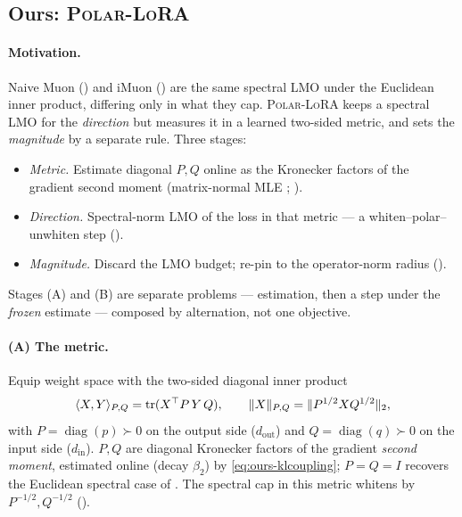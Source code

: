 \documentclass[11pt]{article}
\DeclareMathOperator{\diag}{diag}
\DeclarePairedDelimiter{\norm}{\lVert}{\rVert}
\newcommand{\methodname}{\textsc{Polar-LoRA}\xspace}
\theoremstyle{plain}
\theoremstyle{definition}
\theoremstyle{remark}
\begin{document}
\subsection{Ours: \methodname}
\label{sec:method-ours}
\paragraph{Motivation.} Naive Muon () and iMuon () are the same spectral LMO under the Euclidean inner product, differing only in what they cap. \methodname{} keeps a spectral LMO for the \emph{direction} but measures it in a learned two-sided metric, and sets the \emph{magnitude} by a separate rule. Three stages:
\begin{itemize}[leftmargin=1.7em,itemsep=1pt,topsep=2pt]
  \item[(A)] \emph{Metric.} Estimate diagonal $P,Q$ online as the Kronecker factors of the gradient second moment (matrix-normal MLE \cite{klshampoo}; ).
  \item[(B)] \emph{Direction.} Spectral-norm LMO of the loss in that metric --- a whiten--polar--unwhiten step ().
  \item[(C)] \emph{Magnitude.} Discard the LMO budget; re-pin to the operator-norm radius ().
\end{itemize}
Stages (A) and (B) are separate problems --- estimation, then a step under the \emph{frozen} estimate --- composed by alternation, not one objective.

\paragraph{(A) The metric.} Equip weight space with the two-sided diagonal inner product
\begin{equation}
  \langle X,Y\rangle_{P,Q}=\operatorname{tr}(X^\top P\,Y\,Q),\qquad
  \norm{X}_{P,Q}=\norm{P^{1/2}XQ^{1/2}}_2,
  \label{eq:ours-metric}
\end{equation}
with $P=\diag(p)\succ0$ on the output side ($d_{\mathrm{out}}$) and $Q=\diag(q)\succ0$ on the input side ($d_{\mathrm{in}}$). $P,Q$ are diagonal Kronecker factors of the gradient \emph{second moment}, estimated online (decay $\beta_2$) by \eqref{eq:ours-klcoupling}; $P=Q=I$ recovers the Euclidean spectral case of . The spectral cap in this metric whitens by $P^{-1/2},Q^{-1/2}$ ().
\end{document}

